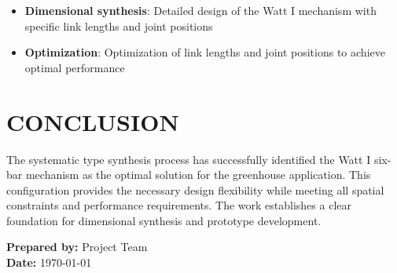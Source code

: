 \documentclass[12pt]{article}
\begin{document}
\begin{itemize}
    \item \textbf{Dimensional synthesis}: Detailed design of the Watt I mechanism with specific link lengths and joint positions
    \item \textbf{Optimization}: Optimization of link lengths and joint positions to achieve optimal performance
\end{itemize}

\section*{CONCLUSION}

The systematic type synthesis process has successfully identified the Watt I six-bar mechanism as the optimal solution for the greenhouse application. This configuration provides the necessary design flexibility while meeting all spatial constraints and performance requirements. The work establishes a clear foundation for dimensional synthesis and prototype development.

\vspace{1cm}

\begin{center}
\textbf{Prepared by:} Project Team \\
\textbf{Date:} \today
\end{center}



\end{document}
